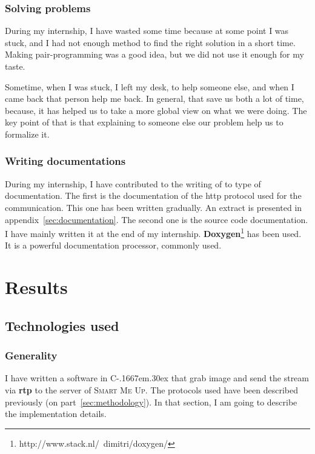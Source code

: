 \documentclass[a4paper,11pt]{custom}
\newcommand{\smu}{\textsc{Smart Me Up}\xspace}
\newcommand{\rtp}{\textbf{rtp}\xspace}
\newcommand{\cpp}{%
  C\kern-.1667em\raise.30ex\hbox{\smaller{++}}%
  \spacefactor1000\xspace%
}
\begin{document}
\subsection{Solving problems}

During my internship, I have wasted some time because at some point I was stuck,
and I had not enough method to find the right solution in a short time. Making
pair-programming was a good idea, but we did not use it enough for my taste.

Sometime, when I was stuck, I left my desk, to help someone else, and when I
came back that person help me back. In general, that save us both a lot of time,
because, it has helped us to take a more global view on what we were doing. The key
point of that is that explaining to someone else our problem help us to
formalize it.

\subsection{Writing documentations}

During my internship, I have contributed to the writing of to type of
documentation. The first is the documentation of the http protocol used for the
communication. This one has been written gradually. An extract is presented in
appendix~\ref{sec:documentation}. The second one is the source
code documentation. I have mainly written it at the end of my internship.
\textbf{Doxygen}\footnote{http://www.stack.nl/~dimitri/doxygen/} has been used.
It is a powerful documentation processor, commonly used.

\chapter{Results}

\section{Technologies used}

\subsection{Generality}

I have written a software in \cpp that grab image and send the stream via \rtp to
the server of \smu. The protocols used have been described previously (on
part~\ref{sec:methodology}). In that section, I am going to describe the
implementation details.
\end{document}
